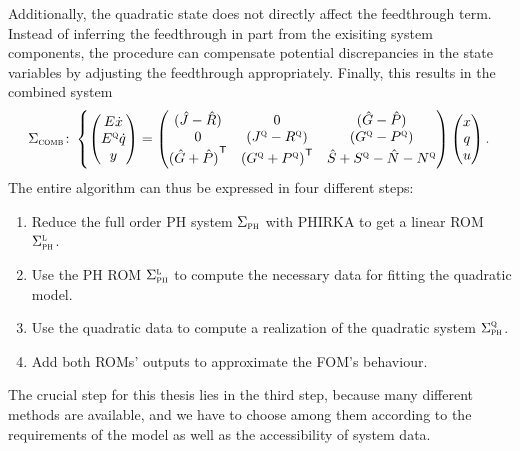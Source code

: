 Additionally, the quadratic state does not directly affect the feedthrough term.
Instead of inferring the feedthrough in part from the exisiting system components, the procedure can compensate potential discrepancies in the state variables by adjusting the feedthrough appropriately.
Finally, this results in the combined system
\begin{equation}\label{eq:combined-quadratic-system}
    \Sigma_{\textnormal{\scshape comb}} \colon \left\lbrace
    \begin{pmatrix}
        E \dot{x} \\
        E^{\textnormal{\scshape q}} \dot{q} \\
        y
    \end{pmatrix} = \begin{pmatrix}
        (\hat{J} - \hat{R}) & 0 & (\hat{G} - \hat{P}) \\
        0 & (J^{\textnormal{\scshape q}} - R^{\textnormal{\scshape q}}) & (G^{\textnormal{\scshape q}} - P^{\textnormal{\scshape q}}) \\
        {(\hat{G} + \hat{P})}^{\mkern1mu \mathsf{T}} & {(G^{\textnormal{\scshape q}} + P^{\textnormal{\scshape q}})}^{\mkern1mu \mathsf{T}} & \hat{S} + S^{\textnormal{\scshape q}} - \hat{N} - N^{\textnormal{\scshape q}}
    \end{pmatrix} \begin{pmatrix}
        x \\
        q \\
        u
    \end{pmatrix}.
    \right.
\end{equation}
The entire algorithm can thus be expressed in four different steps:
\begin{enumerate}
    \item Reduce the full order \ac{PH} system $\Sigma_{\textnormal{\scshape ph}}$ with \ac{PHIRKA} to get a linear \ac{ROM} $\Sigma_{\textnormal{\scshape ph}}^{\textnormal{\scshape l}}$.
    \item Use the \ac{PH} \ac{ROM} $\Sigma_{\textnormal{\scshape ph}}^{\textnormal{\scshape l}}$ to compute the necessary data for fitting the quadratic model.
    \item Use the quadratic data to compute a realization of the quadratic system $\Sigma_{\textnormal{\scshape ph}}^{\textnormal{\scshape q}}$.
    \item Add both \acp{ROM}' outputs to approximate the \ac{FOM}'s behaviour.
\end{enumerate}
The crucial step for this thesis lies in the third step, because many different methods are available, and we have to choose among them according to the requirements of the model as well as the accessibility of system data.


